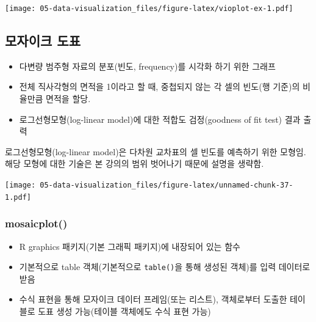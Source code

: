 \documentclass[
  11pt,
]{krantz}
\makeatletter
\providecommand{\tightlist}{%
  \setlength{\itemsep}{0pt}\setlength{\parskip}{0pt}}
\newenvironment{kframe}{%
\medskip{}
\setlength{\fboxsep}{.8em}
 \def\at@end@of@kframe{}%
 \ifinner\ifhmode%
  \def\at@end@of@kframe{\end{minipage}}%
  \begin{minipage}{\columnwidth}%
 \fi\fi%
 \def\FrameCommand##1{\hskip\@totalleftmargin \hskip-\fboxsep
 \colorbox{shadecolor}{##1}\hskip-\fboxsep
     \hskip-\linewidth \hskip-\@totalleftmargin \hskip\columnwidth}%
 \MakeFramed {\advance\hsize-\width
   \@totalleftmargin\z@ \linewidth\hsize
   \@setminipage}}%
 {\par\unskip\endMakeFramed%
 \at@end@of@kframe}
\newenvironment{rmdblock}[1]
  {
  \begin{itemize}
  \renewcommand{\labelitemi}{
    \raisebox{-.7\height}[0pt][0pt]{
      {\setkeys{Gin}{width=3em,keepaspectratio}\texttt{[image: images/\#1]}}
    }
  }
  \setlength{\fboxsep}{1em}
  \begin{kframe}
  \item
  }
  {
  \end{kframe}
  \end{itemize}
  }
\newenvironment{rmdnote}
  {\begin{rmdblock}{note}}
  {\end{rmdblock}}
\makeatother
\begin{document}
\texttt{[image: 05-data-visualization\_files/figure-latex/vioplot-ex-1.pdf]}

\normalsize

\hypertarget{mosaicplot}{%
\subsection{모자이크 도표}\label{mosaicplot}}

\begin{itemize}
\tightlist
\item
  다변량 범주형 자료의 분포(빈도, frequency)를 시각화 하기 위한 그래프
\item
  전체 직사각형의 면적을 1이라고 할 때, 중첩되지 않는 각 셀의 빈도(행 기준)의 비율만큼 면적을 할당.
\item
  로그선형모형(log-linear model)에 대한 적합도 검정(goodness of fit test) 결과 출력
\end{itemize}

\footnotesize

\begin{rmdnote}
\begin{rmdnote}

로그선형모형(log-linear model)은 다차원 교차표의 셀 빈도를 예측하기 위한 모형임. 해당 모형에 대한 기술은 본 강의의 범위 벗어나기 때문에 설명을 생략함.

\end{rmdnote}
\end{rmdnote}

\normalsize

\footnotesize

\texttt{[image: 05-data-visualization\_files/figure-latex/unnamed-chunk-37-1.pdf]}

\normalsize

\hypertarget{mosaicplot_fun}{%
\subsubsection*{\texorpdfstring{\textbf{mosaicplot()}}{mosaicplot()}}\label{mosaicplot_fun}}


\begin{itemize}
\tightlist
\item
  R graphics 패키지(기본 그래픽 패키지)에 내장되어 있는 함수
\item
  기본적으로 table 객체(기본적으로 \texttt{table()}을 통해 생성된 객체)를 입력 데이터로 받음
\item
  수식 표현을 통해 모자이크 데이터 프레임(또는 리스트), 객체로부터 도출한 테이블로 도표 생성 가능(테이블 객체에도 수식 표현 가능)
\end{itemize}
\end{document}
